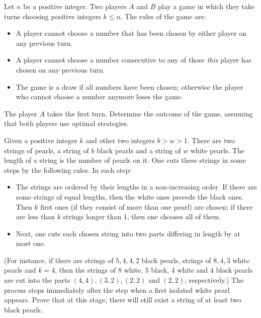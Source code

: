 \begin{problem}

Let $n$ be a positive integer. Two players $A$ and $B$ play a game in which they take turns choosing positive integers $k \le n$. The rules of the game are:
\begin{itemize}
\item A player cannot choose a number that has been chosen by either player on any previous turn.
\item A player cannot choose a number consecutive to any of those \textit{this} player has chosen on any previous turn.
\item The game is a draw if all numbers have been chosen; otherwise the player who cannot choose a number anymore loses the game.
\end{itemize}
The player $A$ takes the first turn. Determine the outcome of the game, assuming that both players use optimal strategies.

\end{problem}

\begin{problem}
Given a positive integer $k$ and other two integers $b > w > 1$. 
There are two strings of pearls, a string of $b$ black pearls and a string of $w$ white pearls. 
The length of a string is the number of pearls on it.
One cuts these strings in some steps by the following rules. In each step:
\begin {itemize}
\item The strings are ordered by their lengths in a non-increasing order. If there are some strings of equal lengths, then the white ones precede the black ones. Then $k$ first ones (if they
consist of more than one pearl) are chosen; if there are less than $k$ strings longer than $1$, then one chooses all of them.
\item Next, one cuts each chosen string into two parts differing in length by at most one.
\end{itemize}
(For instance, if there are strings of $5, 4, 4, 2$ black pearls, strings of $8, 4, 3$ white pearls and $k = 4$, then the strings of $8$ white, $5$ black, $4$ white and $4$ black pearls are cut into the parts $(4, 4), (3, 2), (2, 2)$ and $(2, 2)$, respectively.)
The process stops immediately after the step when a first isolated white pearl appears.
Prove that at this stage, there will still exist a string of at least two black pearls.

\end{problem}

